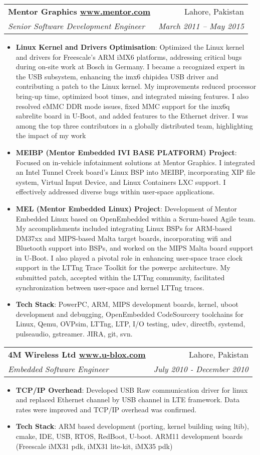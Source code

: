\documentclass[letterpaper,10.8pt]{article}
\makeatletter
\newcommand{\resumeItem}[2]{
  \item\small{
    \textbf{#1}{: #2 \vspace{-2pt}}
  }
}
\newcommand{\resumeSubheading}[4]{
  \vspace{-1pt}\item
    \begin{tabular*}{0.97\textwidth}{l@{\extracolsep{\fill}}r}
      \textbf{#1} & #2 \\
      \textit{\small#3} & \textit{\small #4} \\
    \end{tabular*}\vspace{-5pt}
}
\newcommand{\resumeItemListStart}{\begin{itemize}}
\newcommand{\resumeItemListEnd}{\end{itemize}\vspace{-5pt}}
\makeatother
\begin{document}
    \resumeSubheading
    {Mentor Graphics \href{www.mentor.com}{www.mentor.com}}{Lahore, Pakistan}
    {Senior Software Development Engineer}{March 2011 – May 2015}
    \resumeItemListStart
    \resumeItem{Linux Kernel and Drivers Optimisation}{Optimized the Linux kernel and drivers for Freescale's ARM iMX6 platforms, addressing critical bugs during on-site work at Bosch in Germany. I became a recognized expert in the USB subsystem, enhancing the imx6 chipidea USB driver and contributing a patch to the Linux kernel. My improvements reduced processor bring-up time, optimized boot times, and integrated missing features. I also resolved eMMC DDR mode issues, fixed MMC support for the imx6q sabrelite board in U-Boot, and added features to the Ethernet driver. I was among the top three contributors in a globally distributed team, highlighting the impact of my work}
\resumeItem{MEIBP (Mentor Embedded IVI BASE PLATFORM) Project}{Focused on in-vehicle infotainment solutions at Mentor Graphics. I integrated an Intel Tunnel Creek board's Linux BSP into MEIBP, incorporating XIP file system, Virtual Input Device, and Linux Containers LXC support. I effectively addressed diverse bugs within user-space applications.}
\resumeItem{MEL (Mentor Embedded Linux) Project}{Development of Mentor Embedded Linux based on OpenEmbedded within a Scrum-based Agile team. My accomplishments included integrating Linux BSPs for ARM-based DM37xx and MIPS-based Malta target boards, incorporating wifi and Bluetooth support into BSPs, and worked on the MIPS Malta board support in U-Boot. I also played a pivotal role in enhancing user-space trace clock support in the LTTng Trace Toolkit for the powerpc architecture. My submitted patch, accepted within the LTTng community, facilitated synchronization between user-space and kernel LTTng traces.}
\resumeItem{Tech Stack} {PowerPC, ARM, MIPS development boards, kernel, uboot development and 				debugging, OpenEmbedded CodeSourcery toolchains for Linux, Qemu, OVPsim, LTTng, LTP, I/O testing, 	udev, directfb, systemd, pulseaudio, gstreamer. JIRA, git, svn.}
    \resumeItemListEnd

    \resumeSubheading
    {4M Wireless Ltd \href{www.u-blox.com}{www.u-blox.com}}{Lahore, Pakistan}
    {Embedded Software Engineer}{July 2010 - December 2010}
    \resumeItemListStart
        \resumeItem{TCP/IP Overhead}
          {Developed USB Raw communication driver for linux and replaced Ethernet channel by USB channel in LTE framework. Data rates were improved and TCP/IP overhead was confirmed.}
        \resumeItem{Tech Stack}{ARM based development (porting, kernel building using ltib), cmake, IDE, USB, RTOS, RedBoot, U-boot. 	ARM11 development boards (Freescale iMX31 pdk, iMX31 lite-kit, iMX35 pdk)}
      \resumeItemListEnd
   
\end{document}
